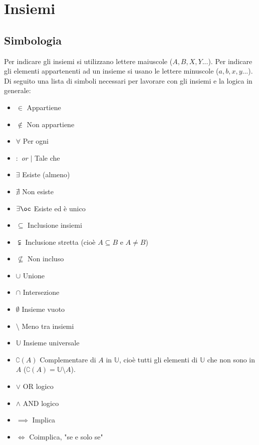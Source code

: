 \section{Insiemi}
\subsection{Simbologia}
Per indicare gli insiemi si utilizzano lettere maiuscole ($A, B, X, Y ...$). Per indicare gli elementi appartenenti ad un insieme si usano le lettere minuscole ($a, b, x, y ...$). Di seguito una lista di simboli necessari per lavorare con gli insiemi e la logica in generale:

\begin{multicols}{2}

\begin{itemize}
    \item $\in$ \qquad Appartiene
    \item $\notin$ \qquad Non appartiene
    \item $\forall$ \qquad Per ogni
    \item $:$ \textit{or} $|$ \qquad Tale che
    \item $\exists$ \qquad Esiste (almeno)
    \item $\nexists$ \qquad Non esiste
    \item $\exists \oc$ \qquad Esiste ed è unico
    
    \item $\subseteq$ \qquad Inclusione insiemi
    \item $\subsetneqq$ \qquad Inclusione stretta (cioè $A \subseteq B$ e $A \neq B$)
    \item $\nsubseteq$ \qquad Non incluso
    
    \item $\cup$ \qquad Unione
    \item $\cap$ \qquad Intersezione
    \item $\emptyset$ \qquad Insieme vuoto
    \item $\setminus$ \qquad Meno tra insiemi
    \item $\mathbb{U}$ \qquad Insieme universale
    \item $\complement \left(A\right)$ \qquad Complementare di $A$ in $\mathbb{U}$, cioè tutti gli elementi di $\mathbb{U}$ che non sono in $A$ ($\complement \left(A\right) = \mathbb{U} \setminus A$).
    
    \item $\lor$ \qquad OR logico
    \item $\land$ \qquad AND logico
    \item $\implies$ \qquad Implica
    \item $\iff$ \qquad Coimplica, "se e solo se" 
\end{itemize}
\end{multicols}

